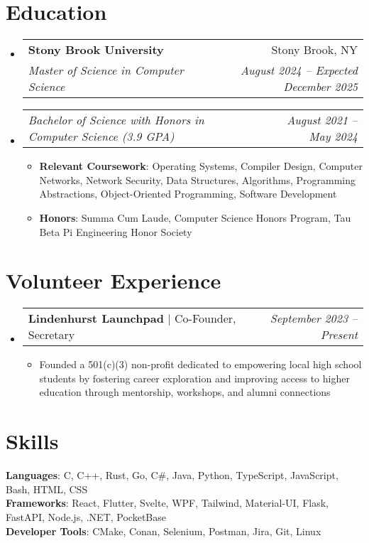 \documentclass[letterpaper,11pt]{article}
\makeatletter
\newcommand{\resumeItem}[1]{
  \item\small{
    {#1 \vspace{-2pt}}
  }
}
\newcommand{\resumeSubheading}[4]{
  \vspace{-2pt}\item
    \begin{tabular*}{0.97\textwidth}[t]{l@{\extracolsep{\fill}}r}
      \textbf{#1} & #2 \\
      \textit{\small#3} & \textit{\small #4} \\
    \end{tabular*}\vspace{-7pt}
}
\newcommand{\resumeSubSubheading}[2]{
    \item
    \begin{tabular*}{0.97\textwidth}{l@{\extracolsep{\fill}}r}
      \textit{\small#1} & \textit{\small #2} \\
    \end{tabular*}\vspace{-7pt}
}
\newcommand{\resumeProjectHeading}[2]{
    \item
    \begin{tabular*}{0.97\textwidth}{l@{\extracolsep{\fill}}r}
      \small#1 & \textit{\small #2} \\
    \end{tabular*}\vspace{-7pt}
}
\newcommand{\resumeSubHeadingListStart}{\begin{itemize}[leftmargin=0.15in, label={}]}
\newcommand{\resumeSubHeadingListEnd}{\end{itemize}}
\newcommand{\resumeItemListStart}{\begin{itemize}}
\newcommand{\resumeItemListEnd}{\end{itemize}\vspace{-5pt}}
\makeatother
\begin{document}
\section{Education}
  \resumeSubHeadingListStart
    \resumeSubheading
    {Stony Brook University}{Stony Brook, NY}
    {Master of Science in Computer Science}{August 2024 -- Expected December 2025}
    \resumeSubSubheading
    {Bachelor of Science with Honors in Computer Science (3.9 GPA)}{August 2021 -- May 2024}
    \resumeItemListStart
        \resumeItem{\textbf{Relevant Coursework}: Operating Systems, Compiler Design, Computer Networks, Network Security, Data Structures, Algorithms, Programming Abstractions, Object-Oriented Programming, Software Development}
        \resumeItem{\textbf{Honors}: Summa Cum Laude, Computer Science Honors Program, Tau Beta Pi Engineering Honor Society}
    \resumeItemListEnd
  \resumeSubHeadingListEnd

\section{Volunteer Experience}
    \resumeSubHeadingListStart
    \resumeProjectHeading
    {\textbf{Lindenhurst Launchpad} $|$ Co-Founder, Secretary} {September 2023 -- Present}
    \resumeItemListStart
        \resumeItem{Founded a 501(c)(3) non-profit dedicated to empowering local high school students by fostering career exploration and improving access to higher education through mentorship, workshops, and alumni connections}
    \resumeItemListEnd
    \resumeSubHeadingListEnd

\section{Skills}
\begin{itemize}[leftmargin=0.15in, label={}]
    \small{\item{
     \textbf{Languages}{: C, C++, Rust, Go, C\#, Java, Python, TypeScript, JavaScript, Bash, HTML, CSS} \\
     \textbf{Frameworks}{: React, Flutter, Svelte, WPF, Tailwind, Material-UI, Flask, FastAPI, Node.js, .NET, PocketBase} \\
     \textbf{Developer Tools}{: CMake, Conan, Selenium, Postman, Jira, Git, Linux}
    }}
 \end{itemize}

\end{document}
